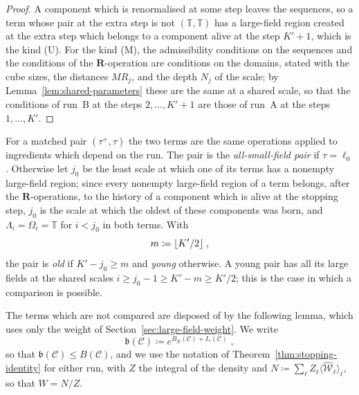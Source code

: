 \documentclass[11pt]{preprint}
\DeclarePairedDelimiter{\floor}{\lfloor}{\rfloor}
\numberwithin{equation}{section}
\theoremstyle{definition}
\theoremstyle{remark}
\theoremstyle{plain}
\begin{document}
\begin{proof}
A component which is renormalised at some step leaves the sequences, so a term whose pair at the extra step is not $(\mathbb T, \mathbb T)$ has a large-field region created at the extra step which belongs to a component alive at the step $K' + 1$, which is the kind (U). For the kind (M), the admissibility conditions on the sequences \cite[pp.~255--256]{BalabanCRE} and the conditions of the $\mathbf R$-operation \cite[p.~177, (i), (ii)]{BalabanLFR1} are conditions on the domains, stated with the cube sizes, the distances $MR_j$, and the depth $N_j$ of the scale; by Lemma~\ref{lem:shared-parameters} these are the same at a shared scale, so that the conditions of run~B at the steps $2, \dots, K' + 1$ are those of run~A at the steps $1, \dots, K'$.
\end{proof}

For a matched pair $(\tau^+, \tau)$ the two terms are the same operations applied to ingredients which depend on the run. The pair is the \emph{all-small-field pair} if $\tau = \ell_0$. Otherwise let $j_0$ be the least scale at which one of its terms has a nonempty large-field region; since every nonempty large-field region of a term belongs, after the $\mathbf R$-operations, to the history of a component which is alive at the stopping step, $j_0$ is the scale at which the oldest of these components was born, and $\Lambda_i = \Omega_i = \mathbb T$ for $i < j_0$ in both terms. With
\begin{equation}\label{eq:young-old}
    m \coloneqq \floor{K'/2}\;,
\end{equation}
the pair is \emph{old} if $K' - j_0 \geq m$ and \emph{young} otherwise. A young pair has all its large fields at the shared scales $i \geq j_0 - 1 \geq K' - m \geq K'/2$; this is the case in which a comparison is possible.

The terms which are not compared are disposed of by the following lemma, which uses only the weight of Section~\ref{sec:large-field-weight}. We write
\begin{equation}\label{eq:loop-majorant}
    \mathfrak b(\mathcal C) \coloneqq e^{B_E(\mathcal C) + I_*(\mathcal C)}\;,
\end{equation}
so that $\mathfrak b(\mathcal C) \leq B(\mathcal C)$, and we use the notation of Theorem~\ref{thm:stopping-identity} for either run, with $Z$ the integral of the density and $N \coloneqq \sum_\ell Z_\ell\langle\widehat{\mathcal W}_\ell\rangle_\ell$, so that $W = N/Z$.
\end{document}
